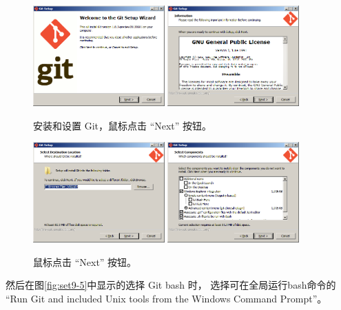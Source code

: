 \documentclass{article}
\begin{document}
\begin{figure}[ht]\centering
  \includegraphics[width=0.45\textwidth]{figures/git/set9-1.png}
  \includegraphics[width=0.45\textwidth]{figures/git/set9-2.png}
  \caption{安装和设置 Git，鼠标点击 ``Next'' 按钮。}\label{fig:set9-1}
\end{figure}

\begin{figure}[ht]\centering
  \includegraphics[width=0.45\textwidth]{figures/git/set9-3.png}
  \includegraphics[width=0.45\textwidth]{figures/git/set9-4.png}
  \caption{鼠标点击 ``Next'' 按钮。}\label{fig:set9-3}
\end{figure}


然后在图\ref{fig:set9-5}中显示的选择 Git bash 时，
选择可在全局运行bash命令的 ``Run Git and included Unix tools from the Windows Command Prompt''。
\end{document}
